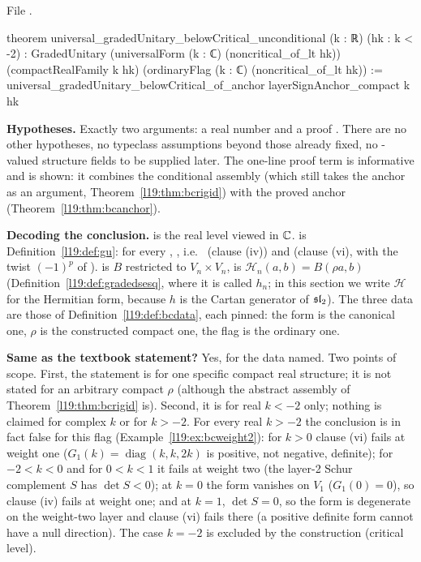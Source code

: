 {\raggedright\noindent File .\par}
\begin{leancode}
theorem universal_gradedUnitary_belowCritical_unconditional (k : ℝ) (hk : k < -2) :
    GradedUnitary (universalForm (k : ℂ) (noncritical_of_lt hk)) (compactRealFamily k hk)
      (ordinaryFlag (k : ℂ) (noncritical_of_lt hk)) :=
  universal_gradedUnitary_belowCritical_of_anchor layerSignAnchor_compact k hk
\end{leancode}

\begin{dictionary}
\textbf{Hypotheses.} Exactly two arguments: a real number  and a proof . There are no
other hypotheses, no typeclass assumptions beyond those already fixed, no -valued structure fields to
be supplied later. The one-line proof term is informative and is shown: it combines the
conditional assembly  (which still takes the anchor as an
argument, Theorem~\ref{l19:thm:bcrigid}) with the proved anchor 
(Theorem~\ref{l19:thm:bcanchor}).

\textbf{Decoding the conclusion.}  is the real level viewed in ${\mathbb{C}}$.  is
Definition~\ref{l19:def:gu}: for every , , i.e.\  (clause (iv)) and  (clause (vi), with the
twist $(-1)^p$ of ).  is $B$ restricted to $V_n\times V_n$,
 is $\mathcal H_n(a,b) = B(\rho a,b)$ (Definition~\ref{l19:def:gradedsesq}, where it is called $h_n$; in this section we write $\mathcal H$ for the Hermitian form, because $h$ is the Cartan generator of $\mathfrak{sl}_2$). The three data are
those of Definition~\ref{l19:def:bcdata}, each pinned: the form is the canonical one, $\rho$ is the constructed
compact one, the flag is the ordinary one.

\textbf{Same as the textbook statement?} Yes, for the data named. Two points of scope. First, the statement is
for one specific compact real structure; it is not stated for an arbitrary compact $\rho$ (although the abstract
assembly of Theorem~\ref{l19:thm:bcrigid} is). Second, it is for real $k<-2$ only; nothing is claimed for
complex $k$ or for $k>-2$. For every real $k>-2$ the conclusion is in fact false for this flag
(Example~\ref{l19:ex:bcweight2}): for $k>0$ clause (vi) fails at weight one ($G_1(k) = \operatorname{diag}(k,k,2k)$ is
positive, not negative, definite); for $-2<k<0$ and for $0<k<1$ it fails at weight two (the layer-2 Schur complement $S$
has $\det S<0$); at $k = 0$ the form vanishes on $V_1$ ($G_1(0) = 0$), so clause (iv) fails at weight one; and at $k = 1$,
$\det S = 0$, so the form is degenerate on the weight-two layer and clause (vi) fails there (a positive definite form
cannot have a null direction). The case $k = -2$ is excluded by the construction (critical level).


\end{dictionary}
